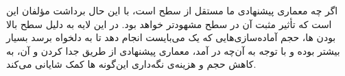 اگر چه معماری پیشنهادی ما مستقل از سطح  است، با این حال برداشت مؤلفان این است که تأثیر مثبت آن در سطح  مشهودتر خواهد بود. در این لایه به دلیل سطح بالا بودن ‌ها، حجم آماده‌سازی‌هایی که یک  می‌بایست انجام دهد تا به  دلخواه برسد بسیار بیشتر بوده و با توجه به آن‌چه در  آمد، معماری پیشنهادی از طریق جدا کردن  و  آن، به کاهش حجم و هزینه‌ی نگه‌داری این‌گونه ‌ها کمک شایانی می‌کند.

